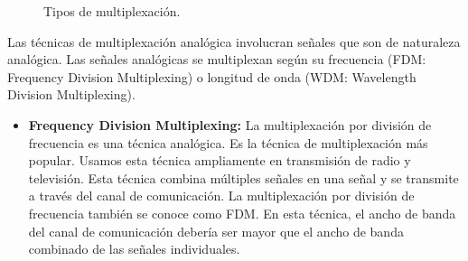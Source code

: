 \begin{enumerate}
\begin{figure}[ht!]
\caption{Tipos de multiplexación.}
\end{figure}

Las técnicas de multiplexación analógica involucran señales que son de naturaleza analógica. Las señales analógicas se multiplexan según su frecuencia (FDM: Frequency Division Multiplexing) o longitud de onda (WDM: Wavelength Division Multiplexing).

\begin{itemize}
\item \textbf{Frequency Division Multiplexing:} La multiplexación por división de frecuencia es una técnica analógica. Es la técnica de multiplexación más popular. Usamos esta técnica ampliamente en transmisión de radio y televisión. Esta técnica combina múltiples señales en una señal y se transmite a través del canal de comunicación. La multiplexación por división de frecuencia también se conoce como FDM. En esta técnica, el ancho de banda del canal de comunicación debería ser mayor que el ancho de banda combinado de las señales individuales.


\end{itemize}
\end{enumerate}
